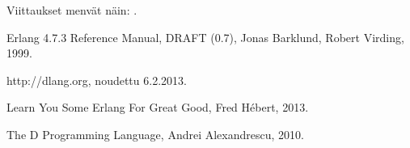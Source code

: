 \documentclass[11pt,oneside,a4paper]{article}
\begin{document}
Viittaukset menvät näin: \cite{HEB13}.




\begin{thebibliography}{99}

 Erlang 4.7.3 Reference Manual, DRAFT (0.7), Jonas
Barklund, Robert Virding, 1999. 

 http://dlang.org, noudettu 6.2.2013.

 Learn You Some Erlang For Great Good, Fred Hébert, 2013.

 The D Programming Language, Andrei Alexandrescu, 2010.

\end{thebibliography}
\end{document}

